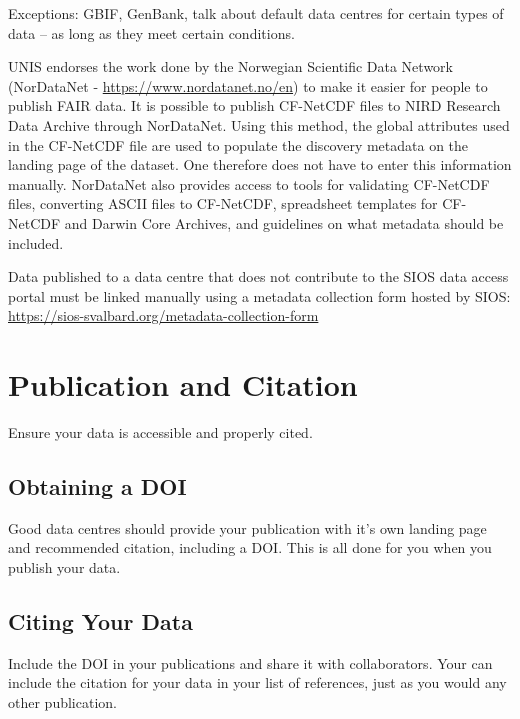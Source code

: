 \documentclass[a4paper,12pt]{article}
\begin{document}
Exceptions: GBIF, GenBank, talk about default data centres for certain types of data – as long as they meet certain conditions.

UNIS endorses the work done by the Norwegian Scientific Data Network (NorDataNet - \url{https://www.nordatanet.no/en}) to make it easier for people to publish FAIR data. It is possible to publish CF-NetCDF files to NIRD Research Data Archive through NorDataNet. Using this method, the global attributes used in the CF-NetCDF file are used to populate the discovery metadata on the landing page of the dataset. One therefore does not have to enter this information manually. NorDataNet also provides access to tools for validating CF-NetCDF files, converting ASCII files to CF-NetCDF, spreadsheet templates for CF-NetCDF and Darwin Core Archives, and guidelines on what metadata should be included.

Data published to a data centre that does not contribute to the SIOS data access portal must be linked manually using a metadata collection form hosted by SIOS: \url{https://sios-svalbard.org/metadata-collection-form}

\section{Publication and Citation}
\label{sec:publication-citation}
Ensure your data is accessible and properly cited.

\subsection{Obtaining a DOI}

Good data centres should provide your publication with it's own landing page and recommended citation, including a DOI. This is all done for you when you publish your data.

\subsection{Citing Your Data}

Include the DOI in your publications and share it with collaborators. Your can include the citation for your data in your list of references, just as you would any other publication. 
\end{document}

